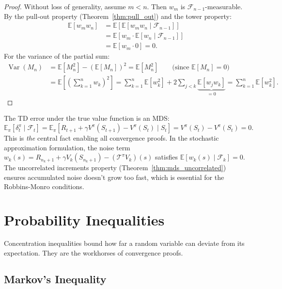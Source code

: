 \documentclass[11pt,a4paper]{article}
\theoremstyle{definition}
\theoremstyle{plain}
\theoremstyle{remark}
\DeclareMathOperator{\Var}{Var}
\newcommand{\E}{\mathbb{E}}
\begin{document}
\begin{proof}
Without loss of generality, assume $m < n$. Then $w_m$ is $\mathcal{F}_{n-1}$-measurable. By the pull-out property (Theorem~\ref{thm:pull_out}) and the tower property:
\begin{align}
    \E[w_m w_n]
    &= \E[\E[w_m w_n \mid \mathcal{F}_{n-1}]] \nonumber\\
    &= \E[w_m \cdot \E[w_n \mid \mathcal{F}_{n-1}]] \nonumber\\
    &= \E[w_m \cdot 0] = 0. \label{eq:mds_uncorrelated_proof}
\end{align}
For the variance of the partial sum:
\begin{align}
    \Var(M_n) &= \E[M_n^2] - (\E[M_n])^2 = \E[M_n^2] \qquad \text{(since } \E[M_n] = 0\text{)} \nonumber\\
    &= \E\!\left[\left(\sum_{k=1}^n w_k\right)^2\right]
    = \sum_{k=1}^n \E[w_k^2] + 2\sum_{j < k} \underbrace{\E[w_j w_k]}_{= 0}
    = \sum_{k=1}^n \E[w_k^2]. \label{eq:mds_var_proof}
\end{align}
\end{proof}

\begin{tdconnection}
The TD error under the true value function is an MDS:
\[
    \E_\pi[\delta_t^\pi \mid \mathcal{F}_t] = \E_\pi[R_{t+1} + \gamma V^\pi(S_{t+1}) - V^\pi(S_t) \mid S_t] = V^\pi(S_t) - V^\pi(S_t) = 0.
\]
This is \emph{the} central fact enabling all convergence proofs. In the stochastic approximation formulation, the noise term $w_k(s) = R_{n_k+1} + \gamma V_k(S_{n_k+1}) - (\mathcal{T}^\pi V_k)(s)$ satisfies $\E[w_k(s) \mid \mathcal{F}_k] = 0$. The uncorrelated increments property (Theorem~\ref{thm:mds_uncorrelated}) ensures accumulated noise doesn't grow too fast, which is essential for the Robbins-Monro conditions.
\end{tdconnection}

\section{Probability Inequalities}
\label{sec:inequalities}

Concentration inequalities bound how far a random variable can deviate from its expectation. They are the workhorses of convergence proofs.

\subsection{Markov's Inequality}
\label{subsec:markov}
\end{document}
